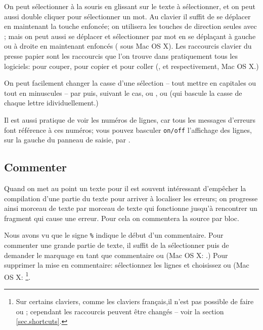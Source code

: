 On peut sélectionner à la souris en \og glissant\fg{} sur le texte à sélectionner, et on peut aussi \og double cliquer\fg{} pour sélectionner un mot. Au clavier il suffit de se déplacer en maintenant la touche  enfoncée; on utilisera les touches de direction seules avec  ; mais on peut aussi se déplacer et sélectionner par mot en se déplaçant à gauche ou à droite en maintenant  enfoncés ( sous Mac OS X). Les raccourcis clavier du presse papier sont les raccourcis que l'on trouve dans pratiquement tous les logiciels:  pour couper,  pour copier et  pour coller (,  et  respectivement, Mac OS X.)

On peut facilement changer la casse d'une sélection -- tout mettre en capitales ou tout en minuscules -- par \submenu{} puis, suivant le cas,  ou , ou  (qui bascule la casse de chaque lettre idividuellement.)

Il est aussi pratique de voir les numéros de lignes, car tous les messages d'erreurs font référence à ces numéros; vous pouvez basculer \texttt{on/off} l'affichage des lignes, sur la gauche du panneau de saisie, par \submenu{}.

\subsection{Commenter}

Quand on met au point un texte pour \AllTeX{} il est souvent intéressant d'empêcher la compilation d'une partie du texte pour arriver à localiser les erreurs; on progresse ainsi morceau de texte par morceau de texte qui fonctionne jusqu'à rencontrer un fragment qui cause une erreur. Pour cela on commentera la source par bloc. 

Nous avons vu que le signe \verb|%| indique le début d'un commentaire. Pour commenter une grande partie de texte, il suffit de la sélectionner puis de demander le marquage en tant que commentaire \submenu{} ou  (Mac OS X: \keysequence{Cmd+Shift+]}.) Pour supprimer la mise en commentaire: sélectionnez les lignes et choisissez \submenu{} ou  (Mac OS X: \keysequence{Cmd+Maj+[} \footnote{Sur certains claviers, comme les claviers français,il n'est pas possible de faire \keysequence{Ctrl+Maj+[} ou \keysequence{Ctrl+Maj+]}; cependant les raccourcis peuvent être changés -- voir la section \ref{sec.shortcuts}.}. 

